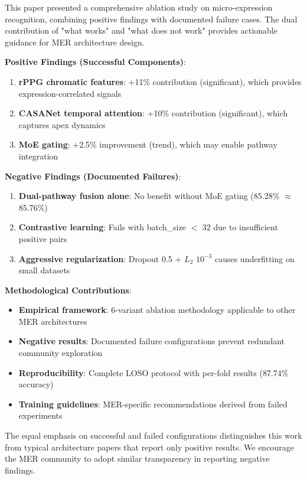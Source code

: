 \documentclass[preprint,12pt,authoryear]{elsarticle}
\begin{document}
This paper presented a comprehensive ablation study on micro-expression recognition, combining positive findings with documented failure cases. The dual contribution of "what works" and "what does not work" provides actionable guidance for MER architecture design.

\textbf{Positive Findings (Successful Components)}:
\begin{enumerate}
\item \textbf{rPPG chromatic features}: +11\% contribution (significant), which provides expression-correlated signals
\item \textbf{CASANet temporal attention}: +10\% contribution (significant), which captures apex dynamics
\item \textbf{MoE gating}: +2.5\% improvement (trend), which may enable pathway integration
\end{enumerate}

\textbf{Negative Findings (Documented Failures)}:
\begin{enumerate}
\item \textbf{Dual-pathway fusion alone}: No benefit without MoE gating (85.28\% $\approx$ 85.76\%)
\item \textbf{Contrastive learning}: Fails with batch\_size $<$ 32 due to insufficient positive pairs
\item \textbf{Aggressive regularization}: Dropout 0.5 + $L_2$ $10^{-3}$ causes underfitting on small datasets
\end{enumerate}

\textbf{Methodological Contributions}:
\begin{itemize}
\item \textbf{Empirical framework}: 6-variant ablation methodology applicable to other MER architectures
\item \textbf{Negative results}: Documented failure configurations prevent redundant community exploration
\item \textbf{Reproducibility}: Complete LOSO protocol with per-fold results (87.74\% accuracy)
\item \textbf{Training guidelines}: MER-specific recommendations derived from failed experiments
\end{itemize}

The equal emphasis on successful and failed configurations distinguishes this work from typical architecture papers that report only positive results. We encourage the MER community to adopt similar transparency in reporting negative findings.
\end{document}

